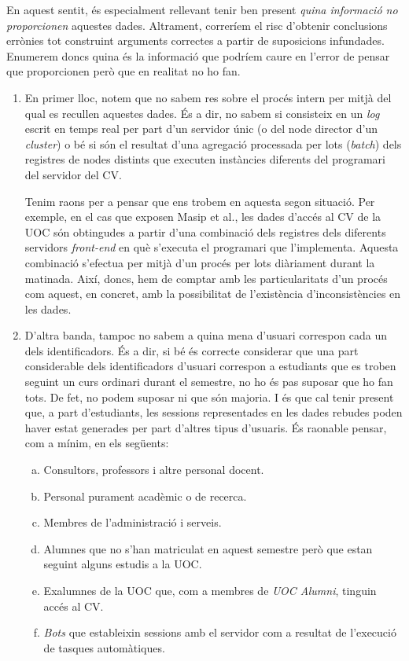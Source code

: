 \documentclass[
	a4paper,
	twoside,
	justified
]{tufte-book}
\begin{document}
En aquest sentit, és especialment rellevant tenir ben present \emph{quina informació no proporcionen} aquestes dades. Altrament, correríem el risc d'obtenir conclusions errònies tot construint arguments correctes a partir de suposicions infundades. Enumerem doncs quina és la informació que podríem caure en l'error de pensar que proporcionen però que en realitat no ho fan.

\begin{enumerate}[(1)]

\item En primer lloc, notem que no sabem res sobre el procés intern per mitjà del qual es recullen aquestes dades. És a dir, no sabem si consisteix en un \emph{log} escrit en temps real per part d'un servidor únic (o del node director d'un \emph{cluster}) o bé si són el resultat d'una agregació processada per lots (\emph{batch}) dels registres de nodes distints que executen instàncies diferents del programari del servidor del CV.

Tenim raons per a pensar que ens trobem en aquesta segon situació. Per exemple, en el cas que exposen Masip et al.\citep{massip10}, les dades d'accés al CV de la UOC són obtingudes a partir d'una combinació dels registres dels diferents servidors \emph{front-end} en què s'executa el programari que l'implementa. Aquesta combinació s'efectua per mitjà d'un procés per lots diàriament durant la matinada. Així, doncs, hem de comptar amb les particularitats d'un procés com aquest, en concret, amb la possibilitat de l'existència d'inconsistències en les dades.

\item D'altra banda, tampoc no sabem a quina mena d'usuari correspon cada un dels
identificadors. És a dir, si bé és correcte considerar que una part considerable dels identificadors d'usuari correspon a estudiants que es troben seguint un curs ordinari durant el semestre, no ho és pas suposar que ho fan tots. De fet, no podem suposar ni que són majoria. I és que cal tenir present que, a part d'estudiants, les sessions representades en les dades rebudes poden haver estat generades per part d'altres tipus d'usuaris. És raonable pensar, com a mínim, en els següents:

	\begin{enumerate}[(a)]
	\item Consultors, professors i altre personal docent.
	\item Personal purament acadèmic o de recerca.
	\item Membres de l'administració i serveis.
	\item Alumnes que no s'han matriculat en aquest semestre però que estan seguint alguns estudis a la UOC.
	\item Exalumnes de la UOC que, com a membres de \emph{UOC Alumni}, tinguin accés al CV.
	\item \emph{Bots} que estableixin sessions amb el servidor com a resultat de l'execució de tasques automàtiques.  
	\end{enumerate}
	

\end{enumerate}
\end{document}
